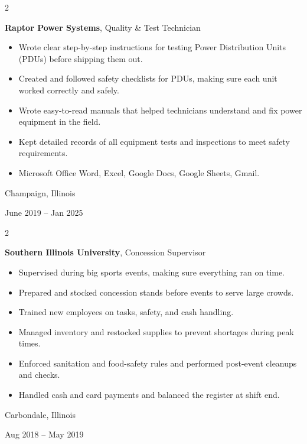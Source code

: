 \documentclass[10pt, letterpaper]{article}
\newenvironment{highlights}{
    \begin{itemize}[
        topsep=0.10 cm,
        parsep=0.10 cm,
        partopsep=0pt,
        itemsep=0pt,
        leftmargin=0.4 cm + 10pt
    ]
}{
    \end{itemize}
} %
\newenvironment{twocolentry}[2][]{
    \onecolentry
    \def\secondColumn{#2}
    \setcolumnwidth{\fill, 4.5 cm}
    \begin{paracol}{2}
}{
    \switchcolumn \raggedleft \secondColumn
    \end{paracol}
    \endonecolentry
} %
\begin{document}
        
        \begin{twocolentry}{
            Champaign, Illinois

        June 2019 – Jan 2025
        }
            \textbf{Raptor Power Systems}, Quality \& Test Technician
            \begin{highlights}
                \item Wrote clear step-by-step instructions for testing Power Distribution Units (PDUs) before shipping them out.
                \item Created and followed safety checklists for PDUs, making sure each unit worked correctly and safely.
                \item Wrote easy-to-read manuals that helped technicians understand and fix power equipment in the field.
                \item Kept detailed records of all equipment tests and inspections to meet safety requirements.
                \item Microsoft Office Word, Excel, Google Docs, Google Sheets, Gmail.
            \end{highlights}
        \end{twocolentry}


        \vspace{0.2 cm}

        \begin{twocolentry}{
            Carbondale, Illinois

        Aug 2018 – May 2019
        }
            \textbf{Southern Illinois University}, Concession Supervisor
            \begin{highlights}
                \item Supervised during big sports events, making sure everything ran on time.
                \item Prepared and stocked concession stands before events to serve large crowds.
                \item Trained new employees on tasks, safety, and cash handling.
                \item Managed inventory and restocked supplies to prevent shortages during peak times.
                \item Enforced sanitation and food-safety rules and performed post-event cleanups and checks.
                \item Handled cash and card payments and balanced the register at shift end.
            \end{highlights}
        \end{twocolentry}
\end{document}
